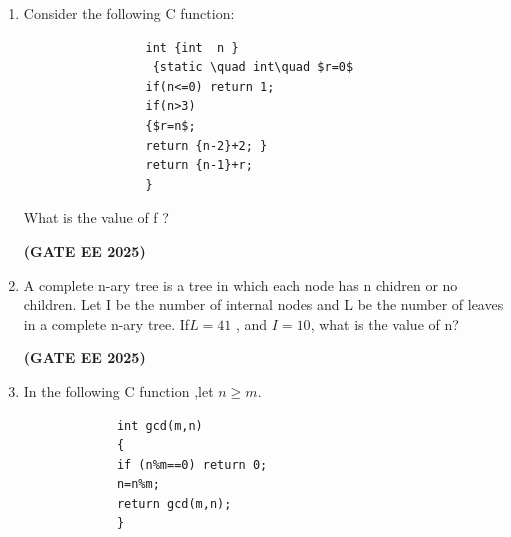\documentclass[journal,12pt,onecolumn]{IEEEtran}
\theoremstyle{remark}
\begin{document}
\begin {center}
\begin{enumerate}
\begin{enumerate}
                 \item  performing a BFS starting from S.
                 \end{enumerate}
                 \item Consider the following C function:
                 \begin{verbatim}
                 int {int  n }
                  {static \quad int\quad $r=0$
                 if(n<=0) return 1;
                 if(n>3)
                 {$r=n$;
                 return {n-2}+2; }
                 return {n-1}+r;
                 }
                 \end{verbatim}
                 
                 
             
       
        
         What is the value of f ?
         \begin{enumerate}
         \end{enumerate}
         \hfill \textbf{(GATE EE 2025)}
         \item A complete n-ary tree  is a tree in which each node has n chidren or no children. Let I be the number of internal nodes and L be the number of leaves in a complete n-ary tree. If$L=41$ , and $I=10$, what is the value of n?
         \begin{enumerate}
         \end{enumerate}
         \hfill \textbf{(GATE EE 2025)}
         \item In  the  following C function ,let $n\geq m$.
         \begin{verbatim}
             int gcd(m,n)
             {
             if (n%m==0) return 0;
             n=n%m;
             return gcd(m,n);  
             }
         \end{verbatim}
         \begin{enumerate}
         \begin{multicols}{4}
             

\end{multicols}
\end{enumerate}
\end{enumerate}
\end{center}
\end{document}
